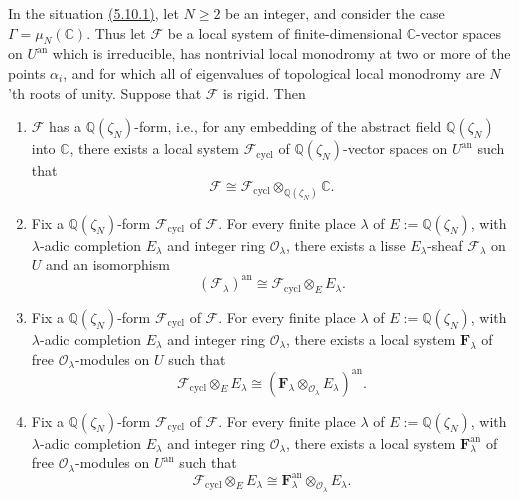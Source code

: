 In the situation \hyperref[par:5.10.1]{(5.10.1)}, let \(N\geq 2\) be an
integer, and consider the case \(\Gamma=\mu_N(\mathbb{C})\). Thus let
\(\mathcal{F}\) be a local system of finite-dimensional \(\mathbb{C}\)-vector
spaces on \(U^{\mathrm{an}}\) which is irreducible, has nontrivial local
monodromy at two or more of the points \(\alpha_i\), and for which all of
eigenvalues of topological local monodromy are \(N\)'th roots of unity.
Suppose that \(\mathcal{F}\) is rigid. Then
\begin{enumerate}[label=(\arabic*)]
\item \(\mathcal{F}\) has a \(\mathbb{Q}(\zeta_N)\)-form, i.e., for any
embedding of the abstract field \(\mathbb{Q}(\zeta_N)\) into \(\mathbb{C}\),
there exists a local system \(\mathcal{F}_{\mathrm{cycl}}\) of
\(\mathbb{Q}(\zeta_N)\)-vector spaces on \(U^{\mathrm{an}}\) such that
\[
  \mathcal{F}\cong
  \mathcal{F}_{\mathrm{cycl}}\otimes_{\mathbb{Q}(\zeta_N)}\mathbb{C}.
\]

\item Fix a \(\mathbb{Q}(\zeta_N)\)-form \(\mathcal{F}_{\mathrm{cycl}}\) of
\(\mathcal{F}\). For every finite place \(\lambda\) of
\(E:=\mathbb{Q}(\zeta_N)\), with \(\lambda\)-adic completion \(E_\lambda\) and
integer ring \(\mathcal{O}_\lambda\), there exists a lisse
\(E_\lambda\)-sheaf \(\mathcal{F}_\lambda\) on \(U\) and an isomorphism
\[
  (\mathcal{F}_\lambda)^{\mathrm{an}}\cong
  \mathcal{F}_{\mathrm{cycl}}\otimes_E E_\lambda.
\]

\item Fix a \(\mathbb{Q}(\zeta_N)\)-form \(\mathcal{F}_{\mathrm{cycl}}\) of
\(\mathcal{F}\). For every finite place \(\lambda\) of
\(E:=\mathbb{Q}(\zeta_N)\), with \(\lambda\)-adic completion \(E_\lambda\) and
integer ring \(\mathcal{O}_\lambda\), there exists a local system
\(\mathbf{F}_\lambda\) of free \(\mathcal{O}_\lambda\)-modules on \(U\) such
that
\[
  \mathcal{F}_{\mathrm{cycl}}\otimes_E E_\lambda\cong
  (\mathbf{F}_\lambda\otimes_{\mathcal{O}_\lambda}E_\lambda)^{\mathrm{an}}.
\]

\item Fix a \(\mathbb{Q}(\zeta_N)\)-form \(\mathcal{F}_{\mathrm{cycl}}\) of
\(\mathcal{F}\). For every finite place \(\lambda\) of
\(E:=\mathbb{Q}(\zeta_N)\), with \(\lambda\)-adic completion \(E_\lambda\) and
integer ring \(\mathcal{O}_\lambda\), there exists a local system
\(\mathbf{F}^{\mathrm{an}}_\lambda\) of free \(\mathcal{O}_\lambda\)-modules
on \(U^{\mathrm{an}}\) such that
\[
  \mathcal{F}_{\mathrm{cycl}}\otimes_E E_\lambda\cong
  \mathbf{F}^{\mathrm{an}}_\lambda\otimes_{\mathcal{O}_\lambda}E_\lambda.
\]
\end{enumerate}

